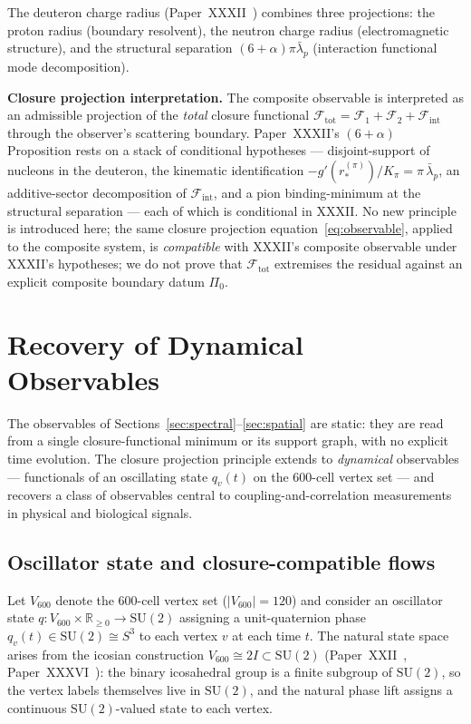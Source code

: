 \documentclass[12pt]{article}
\newcommand{\Fcal}{\mathcal{F}}
\newcommand{\Fint}{\Fcal_{\mathrm{int}}}
\newcommand{\lbar}{\bar{\lambda}}
\begin{document}
The deuteron charge radius (Paper~XXXII~\citep{SmartXXXII}) combines three projections: the proton radius (boundary resolvent), the neutron charge radius (electromagnetic structure), and the structural separation $(6+\alpha)\pi\lbar_p$ (interaction functional mode decomposition).

\textbf{Closure projection interpretation.} The composite observable is interpreted as an admissible projection of the \textit{total} closure functional $\Fcal_{\mathrm{tot}} = \Fcal_1 + \Fcal_2 + \Fint$ through the observer's scattering boundary. Paper~XXXII's $(6+\alpha)$ Proposition rests on a stack of conditional hypotheses --- disjoint-support of nucleons in the deuteron, the kinematic identification $-g'(r_*^{(\pi)})/K_\pi = \pi\,\lbar_p$, an additive-sector decomposition of $\Fint$, and a pion binding-minimum at the structural separation --- each of which is conditional in XXXII. No new principle is introduced here; the same closure projection equation~\eqref{eq:observable}, applied to the composite system, is \emph{compatible} with XXXII's composite observable under XXXII's hypotheses; we do not prove that $\Fcal_{\mathrm{tot}}$ extremises the residual against an explicit composite boundary datum $\Pi_0$.

\section{Recovery of Dynamical Observables}\label{sec:dynamical}

The observables of Sections~\ref{sec:spectral}--\ref{sec:spatial} are static: they are read from a single closure-functional minimum or its support graph, with no explicit time evolution. The closure projection principle extends to \emph{dynamical} observables --- functionals of an oscillating state $q_v(t)$ on the 600-cell vertex set --- and recovers a class of observables central to coupling-and-correlation measurements in physical and biological signals.

\subsection{Oscillator state and closure-compatible flows}\label{subsec:oscillator}

Let $V_{600}$ denote the 600-cell vertex set ($|V_{600}| = 120$) and consider an oscillator state $q : V_{600} \times \mathbb{R}_{\geq 0} \to \mathrm{SU}(2)$ assigning a unit-quaternion phase $q_v(t) \in \mathrm{SU}(2) \cong S^3$ to each vertex $v$ at each time $t$. The natural state space arises from the icosian construction $V_{600} \cong 2I \subset \mathrm{SU}(2)$ (Paper~XXII~\citep{SmartXXII}, Paper~XXXVI~\citep{SmartXXXVI}): the binary icosahedral group is a finite subgroup of $\mathrm{SU}(2)$, so the vertex labels themselves live in $\mathrm{SU}(2)$, and the natural phase lift assigns a continuous $\mathrm{SU}(2)$-valued state to each vertex.
\end{document}
